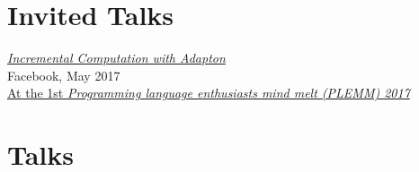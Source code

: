 \documentclass[10pt,letterpaper]{article}
\renewenvironment{itemize}{
  \begin{list}{}{
    \setlength{\leftmargin}{1.5em}
    \setlength{\itemsep}{0.25em}
    \setlength{\parskip}{0pt}
    \setlength{\parsep}{0.25em}
  }
}{
  \end{list}
}
\begin{document}
\section*{Invited Talks}

\begin{itemize}
\item 
\href{https://drive.google.com/file/d/0B6ZM1oYivK60MFRkVkY1c3J5Rzg/view}
{{\textit{Incremental Computation with Adapton}}}
\\
Facebook, May 2017
\\
\href{https://plemm.splashthat.com/}
{At the 1st \textit{Programming language enthusiasts mind melt (PLEMM) 2017}}
\end{itemize}

\section*{Talks}
\end{document}
